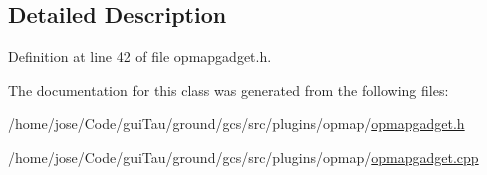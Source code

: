 \subsection{Detailed Description}


Definition at line 42 of file opmapgadget.\-h.



The documentation for this class was generated from the following files\-:\begin{DoxyCompactItemize}
\item 
/home/jose/\-Code/gui\-Tau/ground/gcs/src/plugins/opmap/\hyperlink{opmapgadget_8h}{opmapgadget.\-h}\item 
/home/jose/\-Code/gui\-Tau/ground/gcs/src/plugins/opmap/\hyperlink{opmapgadget_8cpp}{opmapgadget.\-cpp}\end{DoxyCompactItemize}
